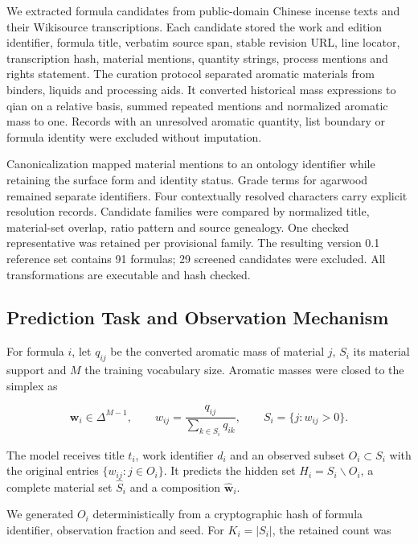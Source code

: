 \documentclass[11pt]{article}
\begin{document}
We extracted formula candidates from public-domain Chinese incense texts and their Wikisource transcriptions. Each candidate stored the work and edition identifier, formula title, verbatim source span, stable revision URL, line locator, transcription hash, material mentions, quantity strings, process mentions and rights statement. The curation protocol separated aromatic materials from binders, liquids and processing aids. It converted historical mass expressions to qian on a relative basis, summed repeated mentions and normalized aromatic mass to one. Records with an unresolved aromatic quantity, list boundary or formula identity were excluded without imputation.

Canonicalization mapped material mentions to an ontology identifier while retaining the surface form and identity status. Grade terms for agarwood remained separate identifiers. Four contextually resolved characters carry explicit resolution records. Candidate families were compared by normalized title, material-set overlap, ratio pattern and source genealogy. One checked representative was retained per provisional family. The resulting version 0.1 reference set contains 91 formulas; 29 screened candidates were excluded. All transformations are executable and hash checked.

\subsection{Prediction Task and Observation Mechanism}

For formula \(i\), let \(q_{ij}\) be the converted aromatic mass of material \(j\), \(S_i\) its material support and \(M\) the training vocabulary size. Aromatic masses were closed to the simplex as

\begin{equation}
\label{eq:composition-closure}
\mathbf{w}_i\in\Delta^{M-1},\qquad w_{ij}=\frac{q_{ij}}{\sum_{k\in S_i}q_{ik}},\qquad S_i=\{j:w_{ij}>0\}.
\end{equation}

The model receives title \(t_i\), work identifier \(d_i\) and an observed subset \(O_i\subset S_i\) with the original entries \(\{w_{ij}:j\in O_i\}\). It predicts the hidden set \(H_i=S_i\mathbin{\backslash} O_i\), a complete material set \(\widehat S_i\) and a composition \(\widehat{\mathbf w}_i\).

We generated \(O_i\) deterministically from a cryptographic hash of formula identifier, observation fraction and seed. For \(K_i=|S_i|\), the retained count was
\end{document}
